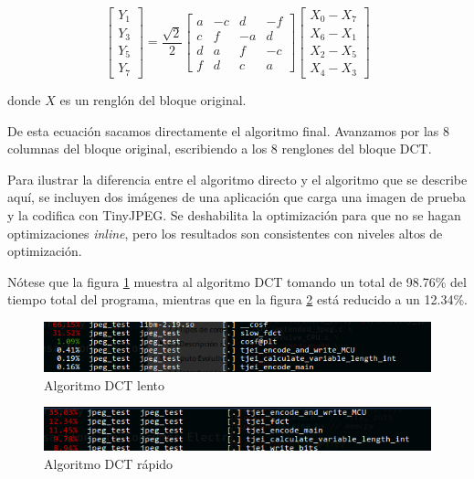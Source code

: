 {\begin{equation*}
    \begin{bmatrix}
        Y_1 \\
        Y_3 \\
        Y_5 \\
        Y_7
    \end{bmatrix}
    = \frac{\sqrt{2}}{2} \begin{bmatrix}
        a & -c & d & -f  \\
        c & f & -a & d  \\
        d & a & f & -c  \\
        f & d & c & a
        \end {bmatrix} \begin {bmatrix}
        X_0 - X_7 \\
        X_6 - X_1 \\
        X_2 - X_5 \\
        X_4 - X_3
        \end {bmatrix}
\end{equation*}

donde $X$ es un renglón del bloque original.

De esta ecuación sacamos directamente el algoritmo final. Avanzamos por las 8 columnas del bloque original, escribiendo a los 8 renglones del bloque DCT.

Para ilustrar la diferencia entre el algoritmo directo y el algoritmo que se describe aquí, se incluyen dos imágenes de una aplicación que carga una imagen de prueba y la codifica con TinyJPEG. Se deshabilita la optimización para que no se hagan optimizaciones \emph{inline}, pero los resultados son consistentes con niveles altos de optimización.

Nótese que la figura \ref{fig:pre_dct} muestra al algoritmo DCT tomando un total de 98.76\% del tiempo total del programa, mientras que en la figura \ref{fig:post_dct} está reducido a un 12.34\%.

\begin{figure}[h]
    \includegraphics[width=1.0\textwidth]{pre_dct}
    \caption{Algoritmo DCT lento}
    \label{fig:pre_dct}
\end{figure}

\begin{figure}[h]
    \includegraphics[width=1.0\textwidth]{post_dct}
    \caption{Algoritmo DCT rápido}
    \label{fig:post_dct}
\end{figure}


}
